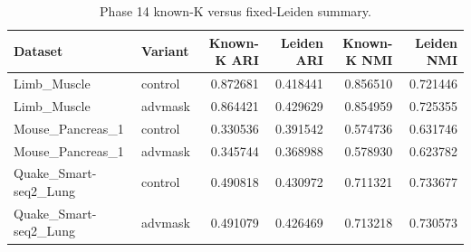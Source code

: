 \begin{table}[ht]
\centering
\caption{Phase 14 known-K versus fixed-Leiden summary.}
\label{tab:generated-phase14-nonoracle}
\begin{tabular}{llrrrr}
\toprule
Dataset & Variant & Known-K ARI & Leiden ARI & Known-K NMI & Leiden NMI \\
\midrule
Limb\_Muscle & control & 0.872681 & 0.418441 & 0.856510 & 0.721446 \\
Limb\_Muscle & advmask & 0.864421 & 0.429629 & 0.854959 & 0.725355 \\
Mouse\_Pancreas\_1 & control & 0.330536 & 0.391542 & 0.574736 & 0.631746 \\
Mouse\_Pancreas\_1 & advmask & 0.345744 & 0.368988 & 0.578930 & 0.623782 \\
Quake\_Smart-seq2\_Lung & control & 0.490818 & 0.430972 & 0.711321 & 0.733677 \\
Quake\_Smart-seq2\_Lung & advmask & 0.491079 & 0.426469 & 0.713218 & 0.730573 \\
\bottomrule
\end{tabular}
\end{table}
